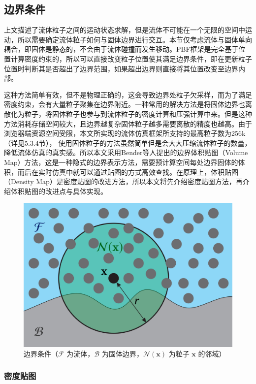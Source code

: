 \subsection{边界条件}

    上文描述了流体粒子之间的运动状态求解，但是流体不可能在一个无限的空间中运动，所以需要确定流体粒子如何与固体边界进行交互。本节仅考虑流体与固体单向耦合，即固体是静态的，不会由于流体碰撞而发生移动。PBF框架是完全基于位置计算密度约束的，所以可以直接改变粒子位置使其满足边界条件，即在更新粒子位置时判断其是否超出了边界范围，如果超出边界则直接将其位置改变至边界内部。
    
    这种方法简单有效，但不是物理正确的，这会导致边界处粒子欠采样，而为了满足密度约束，会有大量粒子聚集在边界附近。一种常用的解决方法是将固体边界也离散化为粒子\cite{AIA12SPHB}，将固体粒子也参与到流体粒子的密度计算和压强计算中来。但是这种方法消耗存储空间较大，且边界越复杂固体粒子越多需要离散的精度也越高。由于浏览器端资源空间受限，本文所实现的流体仿真框架所支持的最高粒子数为256k（详见5.3.4节）， 使用固体粒子的方法虽然简单但是会大大压缩流体粒子的数量，降低流体仿真的真实感。所以本文采用Bender等人\cite{BKW19SPHB}提出的边界体积贴图（Volume Map）方法，这是一种隐式的边界表示方法，需要预计算空间每处边界固体的体积，而后在实时仿真中就可以通过贴图的方式高效查找。在原理上，体积贴图（Density Map）\cite{KB17SPHB}是密度贴图的改进方法，所以本文将先介绍密度贴图方法，再介绍体积贴图的改进点与具体实现。
    
    \begin{figure}
    	\centering
    	\includegraphics[width=.55\textwidth]{figures/simulation/boundary.png}
    	\caption{边界条件（$\mathcal F$ 为流体，$\mathcal B$ 为固体边界，$\mathcal N(\mathbf x)$ 为粒子 $\mathbf x$ 的邻域）}
    \end{figure}

\subsubsection{密度贴图}


